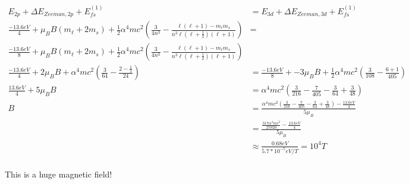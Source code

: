 \documentclass[10pt]{article} %
\begin{document}
\begin{align*}
  E_{2p} + \Delta E_{Zeeman, 2p} + E_{fs}^{(1)} &= E_{3d} + \Delta E_{Zeeman, 3d} + E_{fs}^{(1)}\\
  \frac{-13.6eV}{4} + \mu_BB(m_\ell+2m_s)
  + \frac{1}{2}\alpha^4mc^2\left(\frac{3}{4n^3}
  -\frac{\ell(\ell+1)-m_\ell m_s}{n^3\ell(\ell+\frac{1}{2})(\ell+1)}\right)
  &=\\ \frac{-13.6eV}{8} + \mu_BB(m_\ell+2m_s) + \frac{1}{2}\alpha^4mc^2\left(\frac{3}{4n^3}
  -\frac{\ell(\ell+1)-m_\ell m_s}{n^3\ell(\ell+\frac{1}{2})(\ell+1)}\right)\\
  \frac{-13.6eV}{4} + 2\mu_BB
  + \alpha^4mc^2\left(\frac{3}{64}
  -\frac{2-\frac{1}{2}}{24}\right)
  &= \frac{-13.6eV}{8} + -3\mu_BB + \frac{1}{2}\alpha^4mc^2\left(\frac{3}{108}
  -\frac{6+1}{405}\right)\\
  \frac{13.6eV}{4} + 5\mu_BB
  &= \alpha^4mc^2
  \left(\frac{3}{216} - \frac{7}{405} - \frac{3}{64} + \frac{3}{48}\right)\\
  B &= \frac{\alpha^4mc^2
    \left(\frac{3}{216} - \frac{7}{405} - \frac{3}{64} + \frac{3}{48}\right) - \frac{13.6eV}{4}}{5\mu_B}\\
  &= \frac{\frac{317\alpha^4mc^2}{25920} - \frac{13.6eV}{4}}{5\mu_B}\\
  &\approx \frac{0.68eV}{5.7*10^{-5}eV/T} = 10^4 T\\
\end{align*}

This is a huge magnetic field!\\
\end{document}
